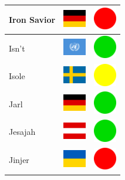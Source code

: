 \documentclass[12pt, a4paper, twoside]{report}
\begin{document}
\begin{center}
\begin{longtable}{|p{5cm}|p{2cm}|p{2cm}|}
Iron Savior & \includegraphics[width=1cm]{4x3/de} & \includegraphics[width=1cm]{likes/n} \\ \hline
Isn't & \includegraphics[width=1cm]{4x3/un} & \includegraphics[width=1cm]{likes/y} \\ \hline
Isole & \includegraphics[width=1cm]{4x3/se} & \includegraphics[width=1cm]{likes/m} \\ \hline
Jarl & \includegraphics[width=1cm]{4x3/de} & \includegraphics[width=1cm]{likes/y} \\ \hline
Jesajah & \includegraphics[width=1cm]{4x3/at} & \includegraphics[width=1cm]{likes/y} \\ \hline
Jinjer & \includegraphics[width=1cm]{4x3/ua} & \includegraphics[width=1cm]{likes/n} \\ \hline

\end{longtable}
\end{center}
\end{document}
